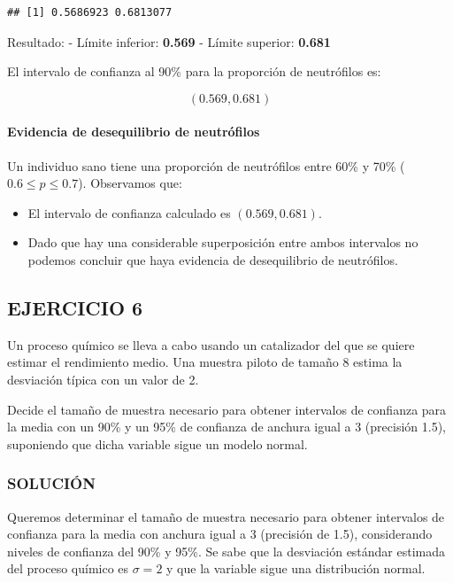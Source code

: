 \documentclass[
]{article}
\begin{document}
\begin{verbatim}
## [1] 0.5686923 0.6813077
\end{verbatim}

Resultado:
- Límite inferior: \textbf{0.569}
- Límite superior: \textbf{0.681}

El intervalo de confianza al 90\% para la proporción de neutrófilos es:

\[ (0.569, 0.681) \]

\paragraph{Evidencia de desequilibrio de neutrófilos}\label{evidencia-de-desequilibrio-de-neutruxf3filos}

Un individuo sano tiene una proporción de neutrófilos entre 60\% y 70\% (\(0.6 \leq p \leq 0.7\)). Observamos que:

\begin{itemize}
\item
  El intervalo de confianza calculado es \((0.569, 0.681)\).
\item
  Dado que hay una considerable superposición entre ambos intervalos no podemos concluir que haya evidencia de desequilibrio de neutrófilos.
\end{itemize}

\subsection{EJERCICIO 6}\label{ejercicio-6-2}

Un proceso químico se lleva a cabo usando un catalizador del que se quiere estimar el rendimiento medio. Una muestra piloto de tamaño 8 estima la desviación típica con un valor de 2.

Decide el tamaño de muestra necesario para obtener intervalos de confianza para la media con un 90\% y un 95\% de confianza de anchura igual a 3 (precisión 1.5), suponiendo que dicha variable sigue un modelo normal.

\subsubsection{SOLUCIÓN}\label{soluciuxf3n-20}

Queremos determinar el tamaño de muestra necesario para obtener intervalos de confianza para la media con anchura igual a 3 (precisión de 1.5), considerando niveles de confianza del 90\% y 95\%. Se sabe que la desviación estándar estimada del proceso químico es \(\sigma = 2\) y que la variable sigue una distribución normal.
\end{document}
